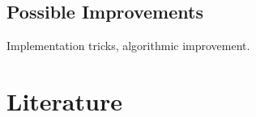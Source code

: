 \documentclass[
  twoside,
  11pt, a4paper,
  footinclude=true,
  headinclude=true,
  cleardoublepage=empty
]{scrreprt}
\begin{document}
        \section{Possible Improvements}
            Implementation tricks, algorithmic improvement.  

    \listoffigures

    \chapter{Literature}
        \printbibliography
\end{document}
